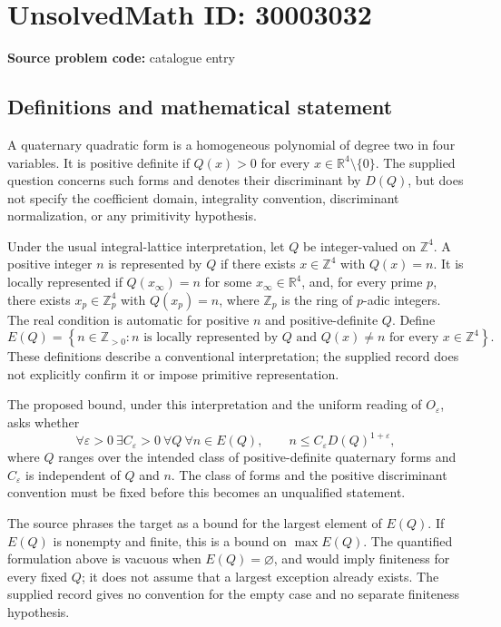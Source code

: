 \documentclass[11pt]{article}
\newcommand{\Z}{\mathbb{Z}}
\newcommand{\R}{\mathbb{R}}
\begin{document}
\section*{UnsolvedMath ID: 30003032}
\textbf{Source problem code:} catalogue entry
\subsection{Definitions and mathematical statement}
A quaternary quadratic form is a homogeneous polynomial of degree two in four variables. It is positive definite if \(Q(x)>0\) for every \(x\in\R^4\setminus\{0\}\). The supplied question concerns such forms and denotes their discriminant by \(D(Q)\), but does not specify the coefficient domain, integrality convention, discriminant normalization, or any primitivity hypothesis.

Under the usual integral-lattice interpretation, let \(Q\) be integer-valued on \(\Z^4\). A positive integer \(n\) is represented by \(Q\) if there exists \(x\in\Z^4\) with \(Q(x)=n\). It is locally represented if \(Q(x_\infty)=n\) for some \(x_\infty\in\R^4\), and, for every prime \(p\), there exists \(x_p\in\Z_p^4\) with \(Q(x_p)=n\), where \(\Z_p\) is the ring of \(p\)-adic integers. The real condition is automatic for positive \(n\) and positive-definite \(Q\). Define
\[
E(Q)=\left\{n\in\Z_{>0}: n\text{ is locally represented by }Q\text{ and }Q(x)\ne n\text{ for every }x\in\Z^4\right\}.
\]
These definitions describe a conventional interpretation; the supplied record does not explicitly confirm it or impose primitive representation.

The proposed bound, under this interpretation and the uniform reading of \(O_\varepsilon\), asks whether
\[
\forall\varepsilon>0\ \exists C_\varepsilon>0\ \forall Q\ \forall n\in E(Q),\qquad n\le C_\varepsilon D(Q)^{1+\varepsilon},
\]
where \(Q\) ranges over the intended class of positive-definite quaternary forms and \(C_\varepsilon\) is independent of \(Q\) and \(n\). The class of forms and the positive discriminant convention must be fixed before this becomes an unqualified statement.

The source phrases the target as a bound for the largest element of \(E(Q)\). If \(E(Q)\) is nonempty and finite, this is a bound on \(\max E(Q)\). The quantified formulation above is vacuous when \(E(Q)=\varnothing\), and would imply finiteness for every fixed \(Q\); it does not assume that a largest exception already exists. The supplied record gives no convention for the empty case and no separate finiteness hypothesis.
\end{document}
